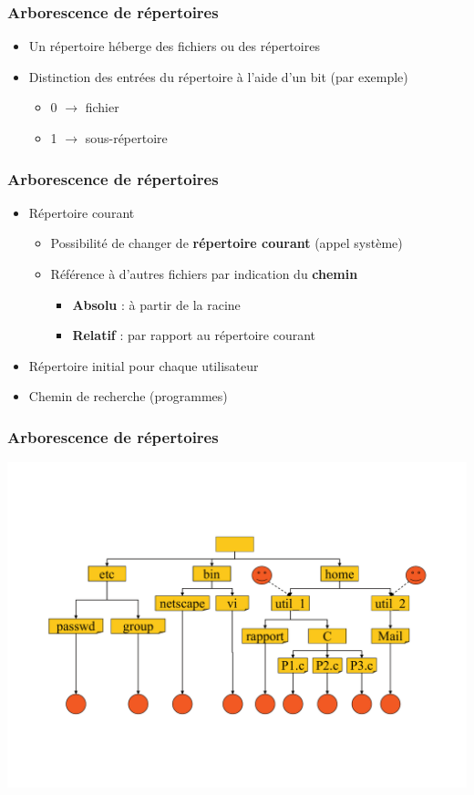 \begin{frame}
\frametitle{Arborescence de répertoires}
\begin{itemize}
\item Un répertoire héberge des fichiers ou des répertoires
\item Distinction des entrées du répertoire à l'aide d'un bit (par exemple)
\begin{itemize}
\item 0 $\rightarrow$ fichier
\item 1 $\rightarrow$ sous-répertoire
\end{itemize}
\end{itemize}
\end{frame}

\begin{frame}
\frametitle{Arborescence de répertoires}
\begin{itemize}
\item Répertoire courant
\begin{itemize}
\item Possibilité de changer de \textbf{répertoire courant} (appel système)
\item Référence à d'autres fichiers par indication du \textbf{chemin}
\begin{itemize}
\item \textbf{Absolu} : à partir de la racine
\item \textbf{Relatif} : par rapport au répertoire courant
\end{itemize}
\end{itemize}
\item Répertoire initial pour chaque utilisateur
\item Chemin de recherche (programmes)
\end{itemize}
\end{frame}

\begin{frame}
\frametitle{Arborescence de répertoires}
\includegraphics[width=\textwidth]{../illustration/repertoire_arbo.pdf}
\end{frame}

